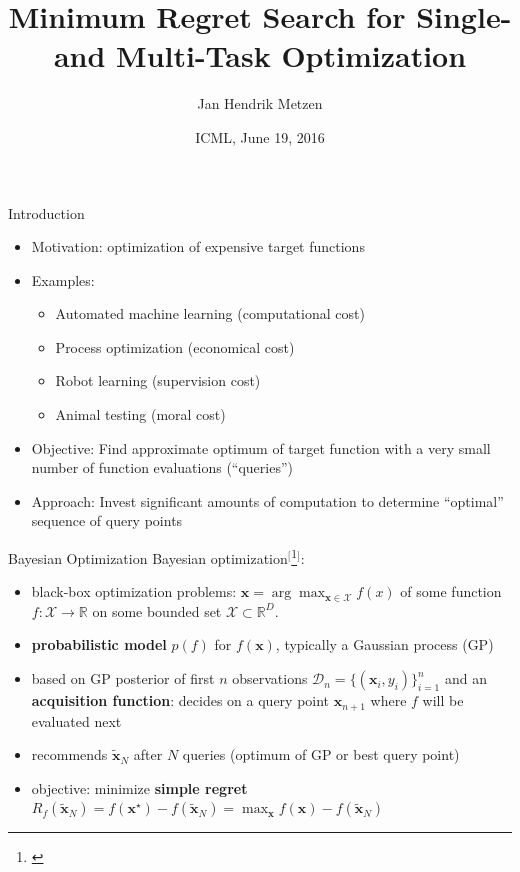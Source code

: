 \documentclass[11pt]{beamer}
\title[ICML 2016]{Minimum Regret Search for Single- and Multi-Task Optimization}
\author[Jan Hendrik Metzen]{Jan Hendrik Metzen}
\institute[]{University Bremen, Robotics Research Group \\ Robert Bosch GmbH, Corporate Research CR/AEY2}
\date[06/19/16]{ICML, June 19, 2016}
\newcommand{\footcite}[1]{$^[$\footnote{\begin{tiny}\bibentry{#1}\end{tiny}}$^]$}
\renewcommand{\emph}[1]{\textbf{#1}}
\begin{document}

\begin{frame}{Introduction}

\begin{itemize}
  \item Motivation: optimization of expensive target functions
  \item Examples:
  \begin{itemize}
    \item Automated machine learning (computational cost)
    \item Process optimization (economical cost)
    \item Robot learning (supervision cost)
    \item Animal testing (moral cost)
  \end{itemize}
  \pause
  \item Objective: Find approximate optimum of target function with a very small number of function evaluations (``queries'')
  \pause
   \item Approach: Invest significant amounts of computation to determine ``optimal'' sequence of query points
\end{itemize}
\vspace*{4cm}
\end{frame}

\begin{frame}{Bayesian Optimization}
Bayesian optimization\footcite{shahriari_taking_2016}:
\begin{itemize}
\item black-box optimization problems: $\mathbf{x} = \arg\max_{\mathbf{x} \in \mathcal{X}} f(x)$ of some function $f: \mathcal{X} \to \mathbb{R}$ on some bounded set $\mathcal{X} \subset \mathbb{R}^D$.
\item \emph{probabilistic model} $p(f)$ for $f(\mathbf{x})$, typically a Gaussian process (GP)
\item based on GP posterior of first $n$ observations $\mathcal{D}_n=\{(\mathbf{x}_i, y_i)\}_{i=1}^n$ and an \emph{acquisition function}: decides on a query point $\mathbf{x}_{n+1}$ where $f$ will be evaluated next
\item recommends $\mathbf{\tilde x}_N$ after $N$ queries (optimum of GP or best query point)
\item objective: minimize \emph{simple regret} 
$R_f(\mathbf{\tilde  x}_N) = f(\mathbf{x}^\star) - f(\mathbf{\tilde  x}_N) = \max_{\mathbf{x}} f(\mathbf{x}) - f(\mathbf{\tilde x}_N)$
\end{itemize}
\vspace*{2cm}
\end{frame}
\end{document}
